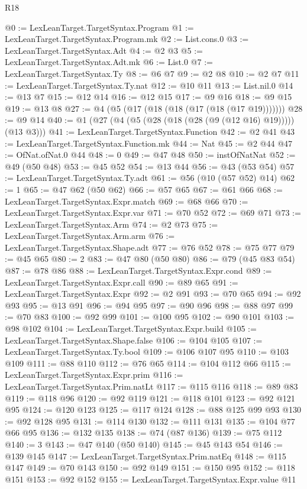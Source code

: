 \begin{lexlean}{R18}
\begin{coremodule}
@0 := LexLeanTarget.TargetSyntax.Program
@1 := LexLeanTarget.TargetSyntax.Program.mk
@2 := List.cons.{0}
@3 := LexLeanTarget.TargetSyntax.Adt
@4 := @2 @3
@5 := LexLeanTarget.TargetSyntax.Adt.mk
@6 := List.{0}
@7 := LexLeanTarget.TargetSyntax.Ty
@8 := @6 @7
@9 := @2 @8
@10 := @2 @7
@11 := LexLeanTarget.TargetSyntax.Ty.nat
@12 := @10 @11
@13 := List.nil.{0}
@14 := @13 @7
@15 := @12 @14
@16 := @12 @15
@17 := @9 @16
@18 := @9 @15
@19 := @13 @8
@27 := @4 (@5 (@17 (@18 (@18 (@17 (@18 (@17 @19)))))))
@28 := @9 @14
@40 := @1 (@27 (@4 (@5 (@28 (@18 (@28 (@9 (@12 @16) @19))))) (@13 @3)))
@41 := LexLeanTarget.TargetSyntax.Function
@42 := @2 @41
@43 := LexLeanTarget.TargetSyntax.Function.mk
@44 := Nat
@45 := @2 @44
@47 := OfNat.ofNat.{0} @44
@48 := 0
@49 := @47 @48
@50 := instOfNatNat
@52 := @49 (@50 @48)
@53 := @45 @52
@54 := @13 @44
@56 := @43 (@53 @54)
@57 := LexLeanTarget.TargetSyntax.Ty.adt
@61 := @56 (@10 (@57 @52) @14)
@62 := 1
@65 := @47 @62 (@50 @62)
@66 := @57 @65
@67 := @61 @66
@68 := LexLeanTarget.TargetSyntax.Expr.match
@69 := @68 @66
@70 := LexLeanTarget.TargetSyntax.Expr.var
@71 := @70 @52
@72 := @69 @71
@73 := LexLeanTarget.TargetSyntax.Arm
@74 := @2 @73
@75 := LexLeanTarget.TargetSyntax.Arm.arm
@76 := LexLeanTarget.TargetSyntax.Shape.adt
@77 := @76 @52
@78 := @75 @77
@79 := @45 @65
@80 := 2
@83 := @47 @80 (@50 @80)
@86 := @79 (@45 @83 @54)
@87 := @78 @86
@88 := LexLeanTarget.TargetSyntax.Expr.cond
@89 := LexLeanTarget.TargetSyntax.Expr.call
@90 := @89 @65
@91 := LexLeanTarget.TargetSyntax.Expr
@92 := @2 @91
@93 := @70 @65
@94 := @92 @93
@95 := @13 @91
@96 := @94 @95
@97 := @90 @96
@98 := @88 @97
@99 := @70 @83
@100 := @92 @99
@101 := @100 @95
@102 := @90 @101
@103 := @98 @102
@104 := LexLeanTarget.TargetSyntax.Expr.build
@105 := LexLeanTarget.TargetSyntax.Shape.false
@106 := @104 @105
@107 := LexLeanTarget.TargetSyntax.Ty.bool
@109 := @106 @107 @95
@110 := @103 @109
@111 := @88 @110
@112 := @76 @65
@114 := @104 @112 @66
@115 := LexLeanTarget.TargetSyntax.Expr.prim
@116 := LexLeanTarget.TargetSyntax.Prim.natLt
@117 := @115 @116
@118 := @89 @83
@119 := @118 @96
@120 := @92 @119
@121 := @118 @101
@123 := @92 @121 @95
@124 := @120 @123
@125 := @117 @124
@128 := @88 @125 @99 @93
@130 := @92 @128 @95
@131 := @114 @130
@132 := @111 @131
@135 := @104 @77 @66 @95
@136 := @132 @135
@138 := @74 (@87 @136)
@139 := @75 @112
@140 := 3
@143 := @47 @140 (@50 @140)
@145 := @45 @143 @54
@146 := @139 @145
@147 := LexLeanTarget.TargetSyntax.Prim.natEq
@148 := @115 @147
@149 := @70 @143
@150 := @92 @149
@151 := @150 @95
@152 := @118 @151
@153 := @92 @152
@155 := LexLeanTarget.TargetSyntax.Expr.value @11

\end{coremodule}
\end{lexlean}
